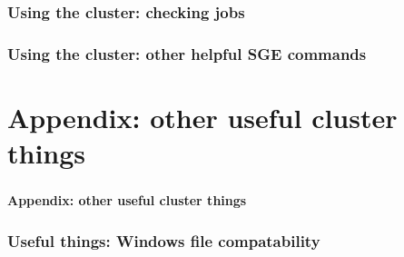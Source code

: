 \documentclass[12pt, 
hyperref={colorlinks=true, linkcolor=BlueViolet, urlcolor=BlueViolet},dvipsnames]{beamer}
\begin{document}
\begin{frame}
\frametitle{Using the cluster: checking jobs}

\end{frame}

\begin{frame}
\frametitle{Using the cluster: other helpful SGE commands}
\end{frame}

\section*{Appendix: other useful cluster things}
\begin{frame}
\frametitle{}
\begin{center}
{\large \textbf{Appendix: other useful cluster things}}
\end{center}
\end{frame}
\begin{frame}
\frametitle{Useful things: Windows file compatability}
\end{frame}
\end{document}
